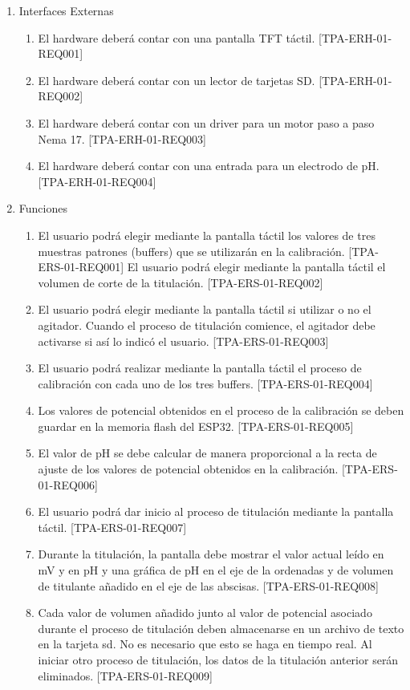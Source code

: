 \documentclass[11pt]{charter}
\begin{document}
\begin{enumerate}
\item Interfaces Externas
	\begin{enumerate}
	\item El hardware deberá contar con una pantalla TFT táctil. [TPA-ERH-01-REQ001]
	\item El hardware deberá contar con un lector de tarjetas SD. [TPA-ERH-01-REQ002]
	\item El hardware deberá contar con un driver para un motor paso a paso Nema 17. [TPA-ERH-01-REQ003]
	\item El hardware deberá contar con una entrada para un electrodo de pH. [TPA-ERH-01-REQ004]
\end{enumerate}
	
\item Funciones
	\begin{enumerate}
	\item El usuario podrá elegir mediante la pantalla táctil los valores de tres muestras patrones (buffers) que se utilizarán en la calibración. [TPA-ERS-01-REQ001]
El usuario podrá elegir mediante la pantalla táctil el volumen de corte de la titulación. [TPA-ERS-01-REQ002]
	\item El usuario podrá elegir mediante la pantalla táctil si utilizar o no el agitador. Cuando el proceso de titulación comience, el agitador debe activarse si así lo indicó el usuario. [TPA-ERS-01-REQ003]
	\item El usuario podrá realizar mediante la pantalla táctil el proceso de calibración con cada uno de los tres buffers. [TPA-ERS-01-REQ004]
	\item Los valores de potencial obtenidos en el proceso de la calibración se deben guardar en la memoria flash del ESP32. [TPA-ERS-01-REQ005]
	\item El valor de pH se debe calcular de manera proporcional a la recta de ajuste de los valores de potencial obtenidos en la calibración. [TPA-ERS-01-REQ006]
	\item El usuario podrá dar inicio al proceso de titulación mediante la pantalla táctil. [TPA-ERS-01-REQ007]
	\item Durante la titulación, la pantalla debe mostrar el valor actual leído en mV y en pH y una gráfica de pH en el eje de la ordenadas y de volumen de titulante añadido en el eje de las abscisas. [TPA-ERS-01-REQ008]
	\item Cada valor de volumen añadido junto al valor de potencial asociado durante el proceso de titulación deben almacenarse en un archivo de texto en la tarjeta sd. No es necesario que esto se haga en tiempo real. Al iniciar otro proceso de titulación, los datos de la titulación anterior serán eliminados. [TPA-ERS-01-REQ009]

\end{enumerate}
\end{enumerate}
\end{document}
